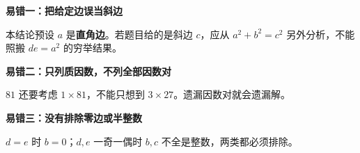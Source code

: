 \clearpage
\begin{trapbox}
\textbf{\textcolor{CTrap}{易错一：把给定边误当斜边}}
\par\medskip
\begin{center}

\end{center}
\medskip
本结论预设 $a$ 是\textbf{直角边}。若题目给的是斜边 $c$，应从 $a^2+b^2=c^2$ 另外分析，不能照搬 $de=a^2$ 的穷举结果。
\end{trapbox}
\clearpage
\begin{trapbox}
\textbf{\textcolor{CTrap}{易错二：只列质因数，不列全部因数对}}
\par\medskip
\begin{center}

\end{center}
\medskip
$81$ 还要考虑 $1\times81$，不能只想到 $3\times27$。遗漏因数对就会遗漏解。
\end{trapbox}
\clearpage
\begin{trapbox}
\textbf{\textcolor{CTrap}{易错三：没有排除零边或半整数}}
\par\medskip
\begin{center}

\end{center}
\medskip
$d=e$ 时 $b=0$；$d,e$ 一奇一偶时 $b,c$ 不全是整数，两类都必须排除。
\end{trapbox}
